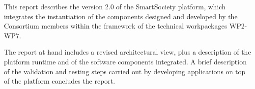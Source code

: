 This report describes the version 2.0 of the SmartSociety platform, which integrates the instantiation of the components designed and developed by the Consortium members within the framework of the technical workpackages WP2-WP7. 

The report at hand includes a revised architectural view, plus a description of the platform runtime and of the software components integrated. A brief description of the validation and testing steps carried out by developing applications on top of the platform concludes the report. 



